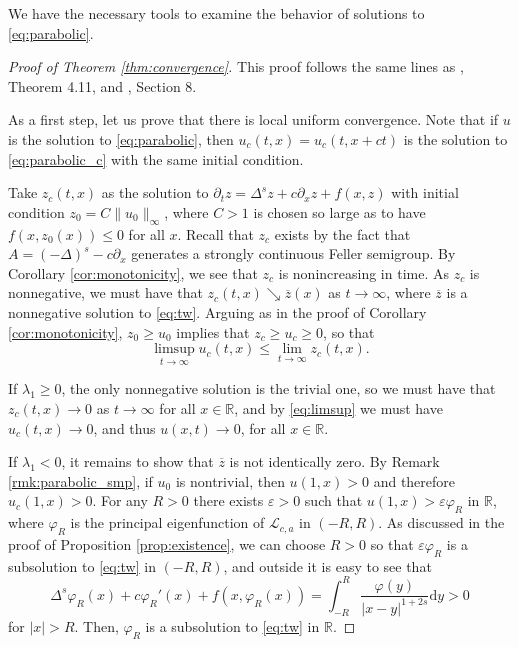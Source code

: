 \documentclass[11pt,a4paper]{amsart}
\newcommand{\Lop}{\mathcal{L}}
\newcommand{\R}{\mathbb{R}}
\newcommand{\dy}{\mathrm{d}y}
\renewcommand{\phi}{\varphi}
\renewcommand{\epsilon}{\varepsilon}
\begin{document}
We have the necessary tools to examine the behavior of solutions to \eqref{eq:parabolic}. 
\begin{proof}[Proof of Theorem \ref{thm:convergence}]
This proof follows the same lines as \cite{B+09}, Theorem 4.11, and \cite{C21}, Section 8.

As a first step, let us prove that there is local uniform convergence. Note that if $u$ is the solution to \eqref{eq:parabolic}, then $u_c(t,x) = u_c(t, x+ct)$ is the solution to \eqref{eq:parabolic_c} with the same initial condition. 

Take $z_c(t,x)$ as the solution to $\partial_t z = \Delta^s z + c \partial_x z +f(x,z)$ with initial condition $z_0 = C\|u_0\|_{\infty}$, where $C>1$ is chosen so large as to have $f(x,z_0(x))\leq 0$ for all $x$. Recall that $z_c$ exists by the fact that $A = (-\Delta)^s - c\partial_x$ generates a strongly continuous Feller semigroup. By Corollary \ref{cor:monotonicity}, we see that $z_c$ is nonincreasing in time. As $z_c$ is nonnegative, we must have that $z_c(t,x)\searrow \overline{z}(x)$ as $t\rightarrow \infty$, where $\overline{z}$ is a nonnegative solution to \eqref{eq:tw}. Arguing as in the proof of Corollary \ref{cor:monotonicity}, $z_0 \geq u_0$ implies that $z_c \geq u_c \geq 0$, so that 
\begin{equation}
\label{eq:limsup}
\limsup_{t\rightarrow \infty} u_c(t,x) \leq \lim_{t\rightarrow\infty} z_c(t,x).
\end{equation}

If $\lambda_1 \geq 0$, the only nonnegative solution is the trivial one, so we must have that $z_c(t,x) \rightarrow 0$ as $t\rightarrow \infty$ for all $x\in \R$, and by \eqref{eq:limsup} we must have $u_c(t,x) \rightarrow 0$, and thus $u(x,t) \rightarrow 0$, for all $x\in\R$.

If $\lambda_1 < 0$, it remains to show that $\overline{z}$ is not identically zero. By Remark \ref{rmk:parabolic_smp}, if $u_0$ is nontrivial, then $u(1,x)> 0$ and therefore $u_c(1,x)>0$. For any $R> 0$ there exists $\epsilon >0$ such that $u(1,x)>\epsilon\phi_R$ in $\R$, where $\phi_R$ is the principal eigenfunction of $\Lop_{c,a}$ in $(-R,R)$. As discussed in the proof of Proposition \ref{prop:existence}, we can choose $R>0$ so that $\epsilon\phi_R$ is a subsolution to \eqref{eq:tw} in $(-R, R)$, and outside it is easy to see that 
\[\Delta^s \phi_R(x) + c \phi_R'(x) + f(x,\phi_R(x)) = \int_{-R}^R \frac{\phi(y)}{|x-y|^{1+2s}}\dy >0 \]
for $|x| >R$. Then, $\phi_R$ is a subsolution to \eqref{eq:tw} in $\R$. 


\end{proof}
\end{document}
